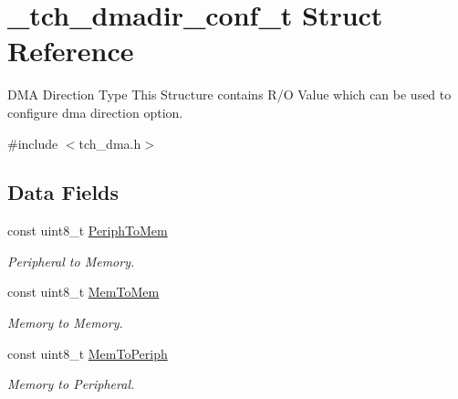 \hypertarget{struct__tch__dmadir__conf__t}{\section{\+\_\+tch\+\_\+dmadir\+\_\+conf\+\_\+t Struct Reference}
\label{struct__tch__dmadir__conf__t}
}


D\+M\+A Direction Type This Structure contains R/\+O Value which can be used to configure dma direction option.  




{\ttfamily \#include $<$tch\+\_\+dma.\+h$>$}

\subsection*{Data Fields}
\begin{DoxyCompactItemize}
\item 
\hypertarget{struct__tch__dmadir__conf__t_ade481d14a22c2ada1c301c0faa146f75}{const uint8\+\_\+t \hyperlink{struct__tch__dmadir__conf__t_ade481d14a22c2ada1c301c0faa146f75}{Periph\+To\+Mem}}\label{struct__tch__dmadir__conf__t_ade481d14a22c2ada1c301c0faa146f75}

\begin{DoxyCompactList}\small\item\em Peripheral to Memory. \end{DoxyCompactList}\item 
\hypertarget{struct__tch__dmadir__conf__t_af3c385c85c9743afa5b234ceff4ad42f}{const uint8\+\_\+t \hyperlink{struct__tch__dmadir__conf__t_af3c385c85c9743afa5b234ceff4ad42f}{Mem\+To\+Mem}}\label{struct__tch__dmadir__conf__t_af3c385c85c9743afa5b234ceff4ad42f}

\begin{DoxyCompactList}\small\item\em Memory to Memory. \end{DoxyCompactList}\item 
\hypertarget{struct__tch__dmadir__conf__t_a6ec44fc7d1aaa2aa32841be48a069666}{const uint8\+\_\+t \hyperlink{struct__tch__dmadir__conf__t_a6ec44fc7d1aaa2aa32841be48a069666}{Mem\+To\+Periph}}\label{struct__tch__dmadir__conf__t_a6ec44fc7d1aaa2aa32841be48a069666}

\begin{DoxyCompactList}\small\item\em Memory to Peripheral. \end{DoxyCompactList}\end{DoxyCompactItemize}


